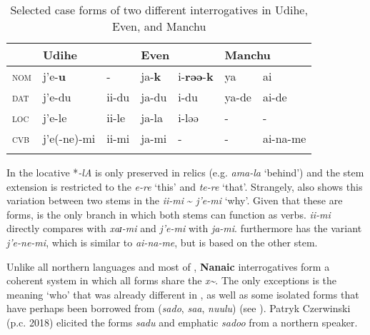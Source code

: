 \begin{table}[t]
\caption{Selected case forms of two different interrogatives in Udihe, Even, and Manchu}
\label{tab:tungu:26}

\begin{tabularx}{\textwidth}{XlXXXXl}
\lsptoprule
& \multicolumn{2}{X}{\textbf{Udihe}} & \multicolumn{2}{X}{\textbf{Even}} & \multicolumn{2}{X}{\textbf{Manchu}}\\
\midrule
\textsc{nom} & j’e-\textbf{u} & - & ja-\textbf{k} & i-\textbf{rəə}-\textbf{k} & ya & ai\\
\textsc{dat} & j’e-du & ii-du & ja-du & i-du & ya-de & ai-de\\
\textsc{loc} & j’e-le & ii-le & ja-la & i-ləə & - & -\\
\textsc{cvb} & j’e(-ne)-mi & ii-mi & ja-mi & - & - & ai-na-me\\
\lspbottomrule
\end{tabularx}
\end{table}

In  the locative *\textit{-lA} is only preserved in relics (e.g. \textit{ama-la} ‘behind’) and the stem extension is restricted to the  \textit{e-re} ‘this’ and \textit{te-re} ‘that’. Strangely,  also shows this variation between two stems in the  \textit{ii-}\textit{mi} {\textasciitilde} \textit{j’e-}\textit{mi} ‘why’. Given that these are  forms,  is the only branch in which both stems can function as  verbs.  \textit{ii-mi} directly compares with  \textit{xaɪ}\textit{-mi} and \textit{j’e-}\textit{mi} with  \textit{ja-mi}.  furthermore has the variant \textit{j’e-ne-}\textit{mi}, which is similar to  \textit{ai-na-me}, but is based on the other stem.

Unlike all northern  languages and most of , \textbf{Nanaic} interrogatives form a coherent system in which all forms share the  \textit{x{\textasciitilde}}. The only exceptions is the  meaning ‘who’ that was already different in , as well as some isolated  forms that have perhaps been borrowed from  (\textit{sado}, \textit{saa}, \textit{nuulu}) (see ). Patryk Czerwinski (p.c. 2018) elicited the forms \textit{sadu} and emphatic \textit{sadoo} from a northern  speaker.


